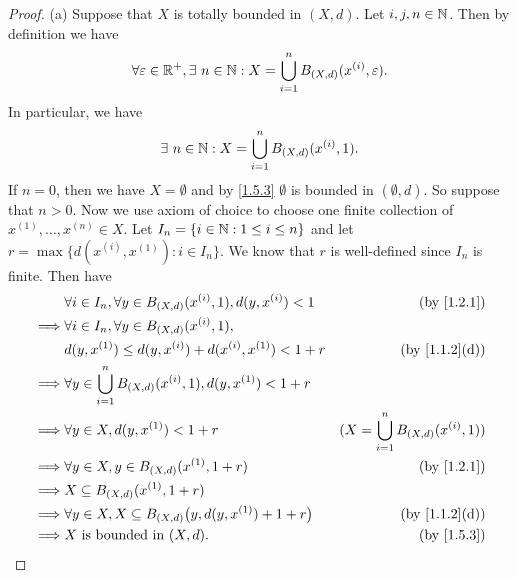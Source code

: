 \begin{proof}{(a)}
  Suppose that \(X\) is totally bounded in \((X, d)\).
  Let \(i, j, n \in \mathbb{N}\).
  Then by definition we have
  \[
    \forall \varepsilon \in \mathbb{R}^+, \exists\ n \in \mathbb{N} : X = \bigcup_{i = 1}^n B_{(X, d)}(x^{(i)}, \varepsilon).
  \]
  In particular, we have
  \[
    \exists\ n \in \mathbb{N} : X = \bigcup_{i = 1}^n B_{(X, d)}(x^{(i)}, 1).
  \]
  If \(n = 0\), then we have \(X = \emptyset\) and by \cref{1.5.3} \(\emptyset\) is bounded in \((\emptyset, d)\).
  So suppose that \(n > 0\).
  Now we use axiom of choice to choose one finite collection of \(x^{(1)}, \dots, x^{(n)} \in X\).
  Let \(I_n = \{i \in \mathbb{N} : 1 \leq i \leq n\}\) and let \(r = \max\{d(x^{(i)}, x^{(1)}) : i \in I_n\}\).
  We know that \(r\) is well-defined since \(I_n\) is finite.
  Then have
  \begin{align*}
             & \forall i \in I_n, \forall y \in B_{(X, d)}(x^{(i)}, 1), d(y, x^{(i)}) < 1    & \text{(by \cref{1.2.1})}                       \\
    \implies & \forall i \in I_n, \forall y \in B_{(X, d)}(x^{(i)}, 1),                                                                       \\
             & d(y, x^{(1)}) \leq d(y, x^{(i)}) + d(x^{(i)}, x^{(1)}) < 1 + r                & \text{(by \cref{1.1.2}(d))}                    \\
    \implies & \forall y \in \bigcup_{i = 1}^n B_{(X, d)}(x^{(i)}, 1), d(y, x^{(1)}) < 1 + r                                                  \\
    \implies & \forall y \in X, d(y, x^{(1)}) < 1 + r                                        & (X = \bigcup_{i = 1}^n B_{(X, d)}(x^{(i)}, 1)) \\
    \implies & \forall y \in X, y \in B_{(X, d)}(x^{(1)}, 1 + r)                             & \text{(by \cref{1.2.1})}                       \\
    \implies & X \subseteq B_{(X, d)}(x^{(1)}, 1 + r)                                                                                         \\
    \implies & \forall y \in X, X \subseteq B_{(X, d)}\big(y, d(y, x^{(1)}) + 1 + r\big)     & \text{(by \cref{1.1.2}(d))}                    \\
    \implies & X \text{ is bounded in } (X, d).                                              & \text{(by \cref{1.5.3})}
  \end{align*}
\end{proof}

